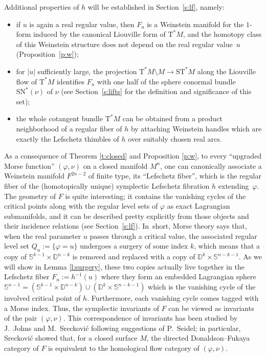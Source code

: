 \documentclass[JEP,XML,SOM,Unicode]{cedram}
\newcommand{\D}{{\mathbb D}}
\newcommand{\bS}{{\mathbb S}}
\newcommand{\sSN}{\mathrm{SN}^\ast}
\newcommand{\sT}{\mathrm{T}^\ast}
\newcommand{\sST}{\mathrm{ST}^\ast}
\newcommand{\de}{\mathrel{:=}}
\theoremstyle{plain}
\theoremstyle{definition}
\begin{document}
Additional properties of $h$ will be established in Section~\ref{s:lf}, namely:
\begin{itemize}
\item
if $u$ is again a real regular value, then $F_u$ is a Weinstein manifold for the
$1$\nobreakdash-form induced by the canonical Liouville form of $\sT M$, and the homotopy
class of this Weinstein structure does not depend on the real regular value~$u$
(\cf Proposition~\ref{p:w});
\item
for $|u|$ sufficiently large, the projection $\sT M \setminus M \to \sST M$ along the
Liouville flow of $\sT M$ identifies $F_u$ with one half of the sphere conormal
bundle $\sSN(\nu)$ of $\nu$ (see Section~\ref{s:lifts} for the definition and
significance of this set);
\item
the whole cotangent bundle $\sT M$ can be obtained from a product neighborhood
of a regular fiber of $h$ by attaching Weinstein handles which are exactly the
Lefschetz thimbles of $h$ over suitably chosen real arcs.
\end{itemize}
As a consequence of Theorem \ref{t:closed} and Proposition \ref{p:w}, to every
``upgraded Morse function'' $(\varphi,\nu)$ on a closed manifold $M^n$, one can
canonically associate a Weinstein manifold $F^{2n-2}$ of finite type, its
``Lefschetz fiber'', which is the regular fiber of the (homotopically unique)
symplectic Lefschetz fibration $h$ extending~$\varphi$. The geometry of $F$ is
quite interesting; it contains the vanishing cycles of the critical points along
with the regular level sets of $\varphi$ as exact Lagrangian submanifolds, and
it can be described pretty explicitly from those objects and their incidence
relations (see Section~\ref{s:lf}). In~short, Morse theory says that, when the
real parameter $u$ passes through a critical value, the associated regular level
set $Q_u \de \{\varphi=u\}$ undergoes a surgery of some index $k$, which means
that a copy of $\bS^{k-1} \times \D^{n-k}$ is removed and replaced with a copy of
$\D^k \times \bS^{n-k-1}$. As we will show in Lemma \ref {l:surgery}, these two
copies actually live together in the Lefschetz fiber $F_u \de h^{-1}(u)$ where
they form an embedded Lagrangian sphere $\bS^{n-1} = (\bS^{k-1} \times \D^{n-k})
\cup (\D^k \times \bS^{n-k-1})$ which is the vanishing cycle of the involved
critical point of $h$. Furthermore, each vanishing cycle comes tagged with a
Morse index. Thus, the symplectic invariants of $F$ can be viewed as invariants
of the pair $(\varphi,\nu)$. This correspondence of invariants has been studied
by J.~Johns and M.~Sreckovi\'c \cite{Jo2,Sr} following suggestions of P.~Seidel;
in particular, Sreckovi\'c showed that, for a closed surface $M$, the directed
Donaldson--Fukaya category of $F$ is equivalent to the homological flow category
of $(\varphi,\nu)$.
\end{document}
